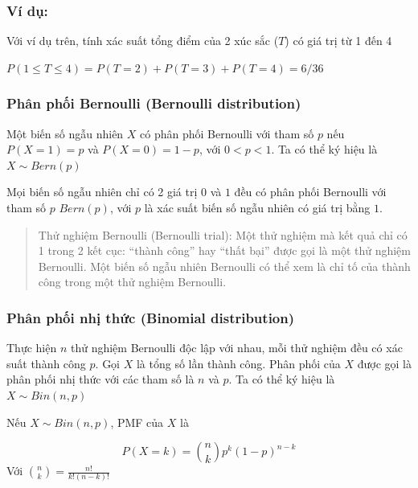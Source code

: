 \documentclass[
]{book}
\begin{document}
\hypertarget{vuxed-dux1ee5-3}{%
\subsubsection{Ví dụ:}\label{vuxed-dux1ee5-3}}

Với ví dụ trên, tính xác suất tổng điểm của 2 xúc sắc (\(T\)) có giá trị từ 1 đến 4

\(P(1 \leq T \leq 4) = P(T = 2) + P(T = 3) + P(T = 4) = 6/36\)

\hypertarget{phuxe2n-phux1ed1i-bernoulli-bernoulli-distribution}{%
\subsubsection{Phân phối Bernoulli (Bernoulli distribution)}\label{phuxe2n-phux1ed1i-bernoulli-bernoulli-distribution}}

Một biến số ngẫu nhiên \(X\) có phân phối Bernoulli với tham số \(p\) nếu \(P(X = 1) = p\) và \(P(X = 0) = 1 - p\), với \(0 < p < 1\). Ta có thể ký hiệu là \(X \sim Bern(p)\)

Mọi biến số ngẫu nhiên chỉ có 2 giá trị \(0\) và \(1\) đều có phân phối Bernoulli với tham số \(p\) \(Bern(p)\), với \(p\) là xác suất biến số ngẫu nhiên có giá trị bằng \(1\).

\begin{quote}
Thử nghiệm Bernoulli (Bernoulli trial): Một thử nghiệm mà kết quả chỉ có 1 trong 2 kết cục: ``thành công'' hay ``thất bại'' được gọi là một thử nghiệm Bernoulli. Một biến số ngẫu nhiên Bernoulli có thể xem là chỉ tố của thành công trong một thử nghiệm Bernoulli.
\end{quote}

\hypertarget{phuxe2n-phux1ed1i-nhux1ecb-thux1ee9c-binomial-distribution}{%
\subsubsection{Phân phối nhị thức (Binomial distribution)}\label{phuxe2n-phux1ed1i-nhux1ecb-thux1ee9c-binomial-distribution}}

Thực hiện \(n\) thử nghiệm Bernoulli độc lập với nhau, mỗi thử nghiệm đều có xác suất thành công \(p\). Gọi \(X\) là tổng số lần thành công. Phân phối của \(X\) được gọi là phân phối nhị thức với các tham số là \(n\) và \(p\). Ta có thể ký hiệu là \(X \sim Bin(n, p)\)

Nếu \(X \sim Bin(n, p)\), PMF của \(X\) là

\[
P(X = k) = {n \choose k} p^k (1-p)^{n-k}
\]
Với \({n \choose k} = \frac{n!}{k!(n-k)!}\)
\end{document}
